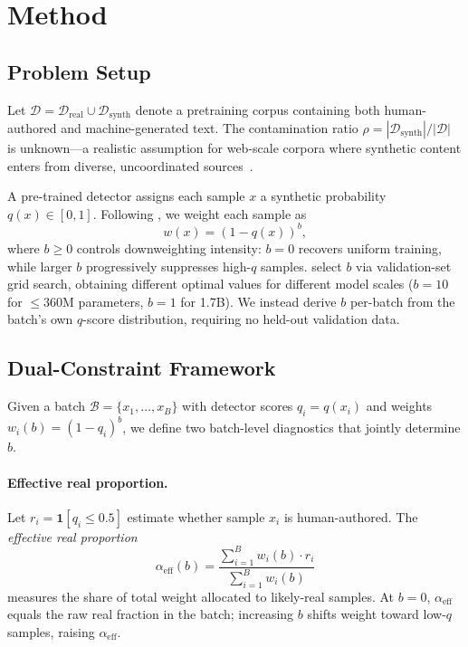 \section{Method}
\label{sec:method}

\subsection{Problem Setup}
\label{sec:setup}

Let $\mathcal{D} = \mathcal{D}_{\mathrm{real}} \cup \mathcal{D}_{\mathrm{synth}}$ denote a pretraining corpus containing both human-authored and machine-generated text.
The contamination ratio $\rho = |\mathcal{D}_{\mathrm{synth}}| / |\mathcal{D}|$ is unknown---a realistic assumption for web-scale corpora where synthetic content enters from diverse, uncoordinated sources~\citep{cheng_2025_contamination_survey}.

A pre-trained detector assigns each sample $x$ a synthetic probability $q(x) \in [0,1]$.
Following \citet{drayson_2025_detection_collapse}, we weight each sample as
\begin{equation}
  w(x) = (1 - q(x))^{b},
  \label{eq:weight}
\end{equation}
where $b \geq 0$ controls downweighting intensity: $b = 0$ recovers uniform training, while larger $b$ progressively suppresses high-$q$ samples.
\citet{drayson_2025_detection_collapse} select $b$ via validation-set grid search, obtaining different optimal values for different model scales ($b{=}10$ for ${\leq}360$M parameters, $b{=}1$ for 1.7B).
We instead derive $b$ per-batch from the batch's own $q$-score distribution, requiring no held-out validation data.

\subsection{Dual-Constraint Framework}
\label{sec:dual}

Given a batch $\mathcal{B} = \{x_1, \ldots, x_B\}$ with detector scores $q_i = q(x_i)$ and weights $w_i(b) = (1 - q_i)^{b}$, we define two batch-level diagnostics that jointly determine $b$.

\paragraph{Effective real proportion.}
Let $r_i = \mathbf{1}[q_i \leq 0.5]$ estimate whether sample $x_i$ is human-authored.
The \emph{effective real proportion}
\begin{equation}
  \alpha_{\mathrm{eff}}(b) = \frac{\sum_{i=1}^{B} w_i(b) \cdot r_i}{\sum_{i=1}^{B} w_i(b)}
  \label{eq:alpha}
\end{equation}
measures the share of total weight allocated to likely-real samples.
At $b = 0$, $\alpha_{\mathrm{eff}}$ equals the raw real fraction in the batch; increasing $b$ shifts weight toward low-$q$ samples, raising $\alpha_{\mathrm{eff}}$.

